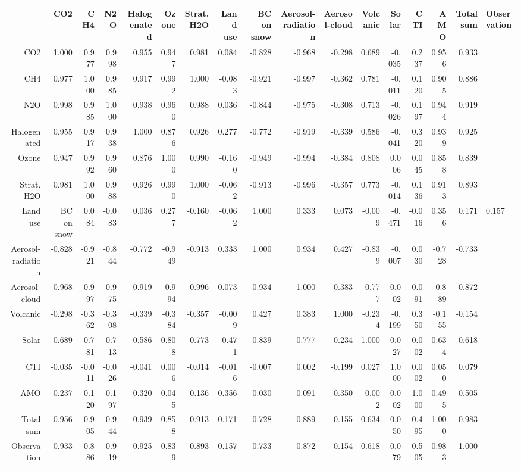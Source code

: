 \begin{table}[ht]
\centering
\begin{tabular}{rrrrrrrrrrrrrrrr}
  \hline
 & CO2 & CH4 & N2O & Halogenated & Ozone & Strat. H2O & Land use & BC on snow & Aerosol-radiation & Aerosol-cloud & Volcanic & Solar & CTI & AMO & Total sum & Observation \\ 
  \hline
CO2 & 1.000 & 0.977 & 0.998 & 0.955 & 0.947 & 0.981 & 0.084 & -0.828 & -0.968 & -0.298 & 0.689 & -0.035 & 0.237 & 0.956 & 0.933 \\ 
  CH4 & 0.977 & 1.000 & 0.985 & 0.917 & 0.992 & 1.000 & -0.083 & -0.921 & -0.997 & -0.362 & 0.781 & -0.011 & 0.120 & 0.905 & 0.886 \\ 
  N2O & 0.998 & 0.985 & 1.000 & 0.938 & 0.960 & 0.988 & 0.036 & -0.844 & -0.975 & -0.308 & 0.713 & -0.026 & 0.197 & 0.944 & 0.919 \\ 
  Halogenated & 0.955 & 0.917 & 0.938 & 1.000 & 0.876 & 0.926 & 0.277 & -0.772 & -0.919 & -0.339 & 0.586 & -0.041 & 0.320 & 0.939 & 0.925 \\ 
  Ozone & 0.947 & 0.992 & 0.960 & 0.876 & 1.000 & 0.990 & -0.160 & -0.949 & -0.994 & -0.384 & 0.808 & 0.006 & 0.045 & 0.858 & 0.839 \\ 
  Strat. H2O & 0.981 & 1.000 & 0.988 & 0.926 & 0.990 & 1.000 & -0.062 & -0.913 & -0.996 & -0.357 & 0.773 & -0.014 & 0.136 & 0.913 & 0.893 \\ 
  Land use & BC on snow & 0.084 & -0.083 & 0.036 & 0.277 & -0.160 & -0.062 & 1.000 & 0.333 & 0.073 & -0.009 & -0.471 & -0.016 & 0.356 & 0.171 & 0.157 \\ 
  Aerosol-radiation & -0.828 & -0.921 & -0.844 & -0.772 & -0.949 & -0.913 & 0.333 & 1.000 & 0.934 & 0.427 & -0.839 & -0.007 & 0.030 & -0.728 & -0.733 \\ 
  Aerosol-cloud & -0.968 & -0.997 & -0.975 & -0.919 & -0.994 & -0.996 & 0.073 & 0.934 & 1.000 & 0.383 & -0.777 & 0.002 & -0.091 & -0.889 & -0.872 \\ 
  Volcanic & -0.298 & -0.362 & -0.308 & -0.339 & -0.384 & -0.357 & -0.009 & 0.427 & 0.383 & 1.000 & -0.234 & -0.199 & 0.350 & -0.155 & -0.154 \\ 
  Solar & 0.689 & 0.781 & 0.713 & 0.586 & 0.808 & 0.773 & -0.471 & -0.839 & -0.777 & -0.234 & 1.000 & 0.027 & -0.002 & 0.634 & 0.618 \\ 
  CTI & -0.035 & -0.011 & -0.026 & -0.041 & 0.006 & -0.014 & -0.016 & -0.007 & 0.002 & -0.199 & 0.027 & 1.000 & 0.002 & 0.050 & 0.079 \\ 
  AMO & 0.237 & 0.120 & 0.197 & 0.320 & 0.045 & 0.136 & 0.356 & 0.030 & -0.091 & 0.350 & -0.002 & 0.002 & 1.000 & 0.495 & 0.505 \\ 
  Total sum & 0.956 & 0.905 & 0.944 & 0.939 & 0.858 & 0.913 & 0.171 & -0.728 & -0.889 & -0.155 & 0.634 & 0.050 & 0.495 & 1.000 & 0.983 \\ 
  Observation & 0.933 & 0.886 & 0.919 & 0.925 & 0.839 & 0.893 & 0.157 & -0.733 & -0.872 & -0.154 & 0.618 & 0.079 & 0.505 & 0.983 & 1.000 \\ 
   \hline
\end{tabular}
\end{table}
